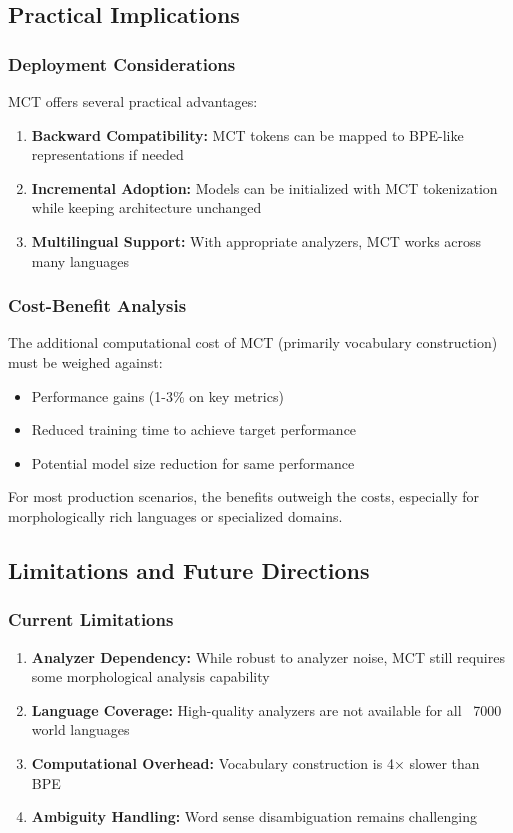 \documentclass[conference]{IEEEtran}
\begin{document}
\subsection{Practical Implications}

\subsubsection{Deployment Considerations}
MCT offers several practical advantages:
\begin{enumerate}
    \item \textbf{Backward Compatibility:} MCT tokens can be mapped to BPE-like representations if needed
    \item \textbf{Incremental Adoption:} Models can be initialized with MCT tokenization while keeping architecture unchanged
    \item \textbf{Multilingual Support:} With appropriate analyzers, MCT works across many languages
\end{enumerate}

\subsubsection{Cost-Benefit Analysis}
The additional computational cost of MCT (primarily vocabulary construction) must be weighed against:
\begin{itemize}
    \item Performance gains (1-3\% on key metrics)
    \item Reduced training time to achieve target performance
    \item Potential model size reduction for same performance
\end{itemize}

For most production scenarios, the benefits outweigh the costs, especially for morphologically rich languages or specialized domains.

\subsection{Limitations and Future Directions}

\subsubsection{Current Limitations}
\begin{enumerate}
    \item \textbf{Analyzer Dependency:} While robust to analyzer noise, MCT still requires some morphological analysis capability
    \item \textbf{Language Coverage:} High-quality analyzers are not available for all ~7000 world languages
    \item \textbf{Computational Overhead:} Vocabulary construction is 4× slower than BPE
    \item \textbf{Ambiguity Handling:} Word sense disambiguation remains challenging
\end{enumerate}
\end{document}
